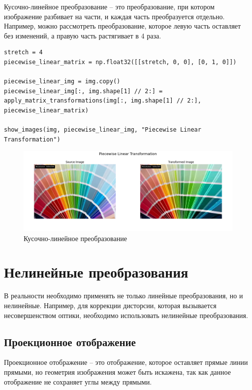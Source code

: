 Кусочно-линейное преобразование -- это преобразование, при котором изображение разбивает на части, и каждая часть преобразуется отдельно.
Например, можно рассмотреть преобразование, которое левую часть оставляет без изменений, а правую часть растягивает в 4 раза.
\begin{lstlisting}[style=python_white, caption={Исходный код для кусочно-линейного преобразования}]
stretch = 4
piecewise_linear_matrix = np.float32([[stretch, 0, 0], [0, 1, 0]])

piecewise_linear_img = img.copy()
piecewise_linear_img[:, img.shape[1] // 2:] = apply_matrix_transformations(img[:, img.shape[1] // 2:], piecewise_linear_matrix)

show_images(img, piecewise_linear_img, "Piecewise Linear Transformation")
\end{lstlisting}

\begin{figure}[ht]
    \includegraphics[width=\textwidth]{../results/Piecewise Linear Transformation.png}
    \caption{Кусочно-линейное преобразование}
    \label{fig:piecewise_linear_image}
\end{figure}

\section{Нелинейные преобразования}

В реальности необходимо применять не только линейные преобразования, но и нелинейные.
Например, для коррекции дисторсии, которая вызывается несовершенством оптики, необходимо использовать нелинейные преобразования.

\subsection{Проекционное отображение}
Проекционное отображение -- это отображение, которое оставляет прямые линии прямыми, но геометрия изображения может быть искажена, так как 
данное отображение не сохраняет углы между прямыми.

